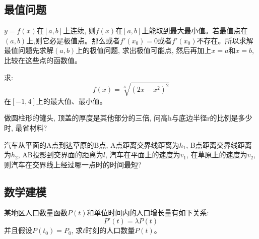 \subsection{最值问题}
$y = f(x)$在$[a, b]$上连续, 则$f(x)$在$[a, b]$上能取到最大最小值。若最值点在$(a, b)$上,则它必是极值点。那么或者$f'(x_0) = 0$或者$f'(x_0)$不存在。所以求解最值问题先求解$(a, b)$上的极值问题, 求出极值可能点, 然后再加上$x = a$和$x = b$, 比较在这些点的函数值。

\begin{example}
    求:
    \begin{equation*}
        f(x) = \sqrt[3]{(2x-x^2)^2}
    \end{equation*}
    在$[-1, 4]$上的最大值、最小值。
\end{example}
\begin{solution}
    
\end{solution}

\begin{example}
    做圆柱形的罐头, 顶盖的厚度是其他部分的三倍, 问高h与底边半径r的比例是多少时, 最省材料?
\end{example}
\begin{solution}
    
\end{solution}

\begin{example}
    汽车从平面的A点到达草原的B点, A点距离交界线距离为$h_1$, B点距离交界线距离为$h_2$, AB投影到交界面的距离为$l$, 汽车在平面上的速度为$v_1$, 在草原上的速度为$v_2$, 则汽车在交界线上经过哪一点时的时间最短?
\end{example}
\begin{solution}
    
\end{solution}

\subsection{数学建模}
\begin{example}[(Malthus人口模型)]
    某地区人口数量函数$P(t)$和单位时间内的人口增长量有如下关系:
    \begin{equation*}
        P'(t) = \lambda P(t)
    \end{equation*}
    并且假设$P(t_0) = P_0$, 求$t$时刻的人口数量$P(t)$。
\end{example}
\begin{solution}
    
\end{solution}

